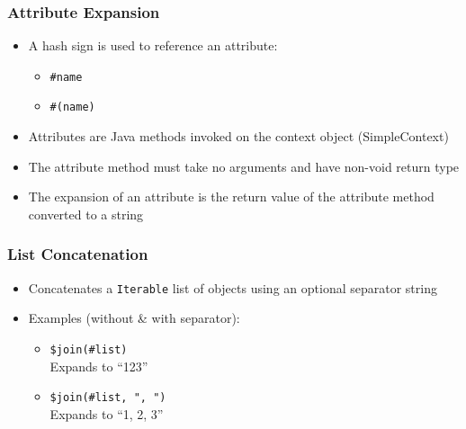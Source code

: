 \documentclass[a4paper,12pt,presentation]{beamer}
\begin{document}
\begin{frame}[fragile]
    \frametitle{Attribute Expansion}

    \begin{itemize}
        \item A hash sign is used to reference an attribute:
            \begin{itemize}
                \item \verb'#name'
                \item \verb'#(name)'
            \end{itemize}
        \item Attributes are Java methods invoked on the context object
            (SimpleContext)
        \item The attribute method must take no arguments and have non-void
            return type
        \item The expansion of an attribute is the return value of the
            attribute method converted to a string
    \end{itemize}
    
\end{frame}

\begin{frame}[fragile]
    \frametitle{List Concatenation}
    \begin{itemize}
        \item Concatenates a \verb'Iterable' list of objects using an optional
            separator string
        \item Examples (without \& with separator):
            \begin{itemize}
                \item \verb'$join(#list)' \\
                    Expands to ``123''
                \item \verb'$join(#list, ", ")' \\
                    Expands to ``1, 2, 3''
            \end{itemize}
    \end{itemize}
\end{frame}
\end{document}
